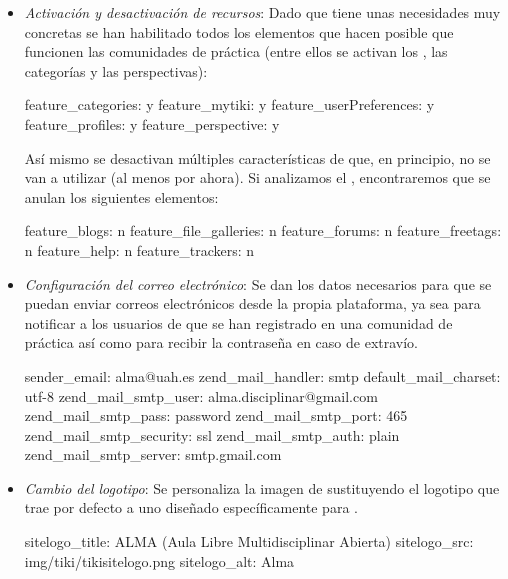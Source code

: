 \begin{itemize}
\item \textit{Activación y desactivación de recursos}: Dado que \alma{} tiene unas necesidades muy concretas se han habilitado todos los elementos que hacen posible que funcionen las comunidades de práctica (entre ellos se activan los \profiles{}, las categorías y las perspectivas):

\begin{pyglist}[language=text]
  feature_categories:  y
  feature_mytiki: y
  feature_userPreferences: y
  feature_profiles: y
  feature_perspective: y
\end{pyglist}

Así mismo se desactivan múltiples características de \tiki{} que, en principio, no se van a utilizar (al menos por ahora). Si analizamos el \profile{}, encontraremos que se anulan los siguientes elementos: 

\begin{pyglist}[language=text]
  feature_blogs:  n  
  feature_file_galleries:  n
  feature_forums:  n
  feature_freetags:  n
  feature_help:  n
  feature_trackers: n
\end{pyglist}

\item \textit{Configuración del correo electrónico}: Se dan los datos necesarios para que se puedan enviar correos electrónicos desde la propia plataforma, ya sea para notificar a los usuarios de que se han registrado en una comunidad de práctica así como para recibir la contraseña en caso de extravío.

\begin{pyglist}[language=text]
  sender_email: alma@uah.es
  zend_mail_handler: smtp
  default_mail_charset: utf-8
  zend_mail_smtp_user: alma.disciplinar@gmail.com
  zend_mail_smtp_pass: password
  zend_mail_smtp_port: 465
  zend_mail_smtp_security: ssl
  zend_mail_smtp_auth: plain
  zend_mail_smtp_server: smtp.gmail.com
\end{pyglist}

\item \textit{Cambio del logotipo}: Se personaliza la imagen de \tiki{} sustituyendo el logotipo que trae por defecto a uno diseñado específicamente para \alma{}.

\begin{pyglist}[language=text]
  sitelogo_title: ALMA (Aula Libre Multidisciplinar Abierta)
  sitelogo_src: img/tiki/tikisitelogo.png
  sitelogo_alt: Alma
\end{pyglist}



\end{itemize}
